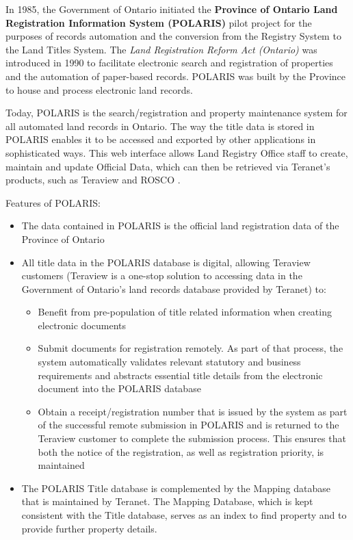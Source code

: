 \documentclass[11pt]{article}
\begin{document}
    In 1985, the Government of Ontario initiated the \textbf{Province of Ontario Land Registration Information System (POLARIS)} pilot project for the purposes of records automation and the conversion from the Registry System to the Land Titles System.
    The \textit{Land Registration Reform Act (Ontario)}\cite{TheGovernmentofOntario1990} was introduced in 1990 to facilitate electronic search and registration of properties and the automation of paper-based records.
    POLARIS was built by the Province to house and process electronic land records.

    Today, POLARIS is the search/registration and property maintenance system for all automated land records in Ontario.
    The way the title data is stored in POLARIS enables it to be accessed and exported by other applications in sophisticated ways.
    This web interface allows Land Registry Office staff to create, maintain and update Official Data, which can then be retrieved via Teranet's products, such as Teraview and ROSCO .

    \vspace{5mm}

    Features of POLARIS\cite{TeranetEnterprisesInc.2019}:

    \begin{itemize}
        \item The data contained in POLARIS is the official land registration data of the Province of Ontario
        \item All title data in the POLARIS database is digital, allowing Teraview customers (Teraview is a one-stop solution to accessing data in the Government of Ontario's land records database provided by Teranet) to:
        \begin{itemize}
            \item Benefit from pre-population of title related information when creating electronic documents
            \item Submit documents for registration remotely.
            As part of that process, the system automatically validates relevant statutory and business requirements and abstracts essential title details from the electronic document into the POLARIS database
            \item Obtain a receipt/registration number that is issued by the system as part of the successful remote submission in POLARIS and is returned to the Teraview customer to complete the submission process.
            This ensures that both the notice of the registration, as well as registration priority, is maintained
        \end{itemize}
        \item The POLARIS Title database is complemented by the Mapping database that is maintained by Teranet.
        The Mapping Database, which is kept consistent with the Title database, serves as an index to find property and to provide further property details.
    \end{itemize}
\end{document}
